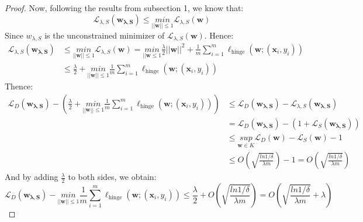 \begin{proof}
    Now, following the results from subsection 1, we know that:
    \begin{equation*}
        \mathcal{L}_{\lambda, S}(\boldsymbol{w_{\lambda, S}}) \leq \underset{||\boldsymbol{w}|| \leq 1}{min} \mathcal{L}_{\lambda, S}(\boldsymbol{w})
    \end{equation*}
    Since $w_{\lambda, S}$ is the unconstrained minimizer of $\mathcal{L}_{\lambda, S}(\boldsymbol{w})$. Hence:
    \begin{equation*}
        \begin{split}            
            \mathcal{L}_{\lambda, S}(\boldsymbol{w_{\lambda, S}}) &\leq \underset{||\boldsymbol{w}|| \leq 1}{min} \mathcal{L}_{\lambda, S}(\boldsymbol{w})
            = \underset{||\boldsymbol{w}\leq 1}{min} \frac{\lambda}{2} ||\boldsymbol{w}||^2 + \frac{1}{m} \sum_{i=1}^m \ell_{\text{hinge}}(\boldsymbol{w};(\boldsymbol{x}_i, y_i)) \\
            &\leq \frac{\lambda}{2} + \underset{||\boldsymbol{w}|| \leq 1}{min} \frac{1}{m} \sum_{i=1}^m \ell_{\text{hinge}}(\boldsymbol{w};(\boldsymbol{x}_i, y_i))
        \end{split}
    \end{equation*}
    Thence:
    \begin{equation*}
        \begin{split}
            \mathcal{L}_D(\boldsymbol{w_{\lambda, S}}) - \left(\frac{\lambda}{2} + \underset{||\boldsymbol{w}|| \leq 1}{min} \frac{1}{m} \sum_{i=1}^m \ell_{\text{hinge}}(\boldsymbol{w};(\boldsymbol{x}_i, y_i))\right) 
            &\leq \mathcal{L}_D(\boldsymbol{w_{\lambda, S}}) - \mathcal{L}_{\lambda, S}(\boldsymbol{w_{\lambda, S}}) \\
            &= \mathcal{L}_D(\boldsymbol{w_{\lambda, S}}) - \left(1 + \mathcal{L}_S(\boldsymbol{w_{\lambda, S}})\right) \\
            &\leq \underset{\boldsymbol{w} \in K}{sup} \mathcal{L}_D(\boldsymbol{w}) - \mathcal{L}_S(\boldsymbol{w}) - 1 \\
            &\leq O\left(\sqrt{\frac{ln 1/\delta}{\lambda m}} \right) - 1 = O\left(\sqrt{\frac{ln 1/\delta}{\lambda m}} \right)
        \end{split}
    \end{equation*}
    And by adding $\frac{\lambda}{2}$ to both sides, we obtain:
    \begin{equation*}
        \mathcal{L}_D(\boldsymbol{w_{\lambda, S}}) - \underset{||\boldsymbol{w}|| \leq 1}{min} \frac{1}{m} \sum_{i=1}^m \ell_{\text{hinge}}(\boldsymbol{w};(\boldsymbol{x}_i, y_i)) \leq \frac{\lambda}{2} + O\left(\sqrt{\frac{ln 1/\delta}{\lambda m}} \right) = O\left(\sqrt{\frac{ln 1/\delta}{\lambda m}} + \lambda \right)
    \end{equation*}    
\end{proof}

